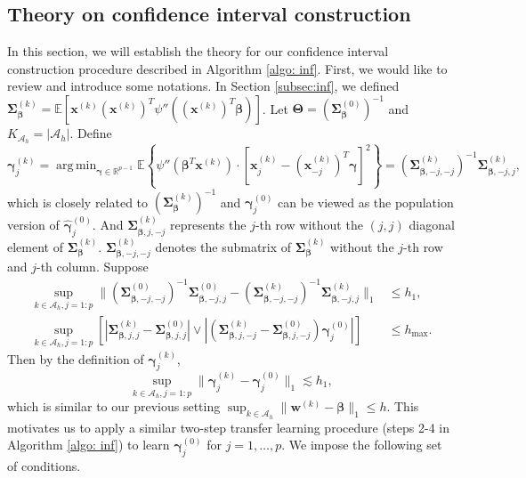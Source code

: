\documentclass[12pt]{article}
\DeclareMathOperator*{\argmin}{arg\,min}
\newcommand{\te}{\mathbb{E}}
\newcommand{\onenorm}[1]{\|#1\|_{1}}
\newcommand{\norm}[1]{|#1|}
\newcommand{\bbeta}{\bm{\beta}}
\newcommand{\bgamma}{\bm{\gamma}}
\newcommand{\bgammak}[1]{\bm{\gamma}^{(#1)}}
\newcommand{\hbgammak}[1]{\hat{\bm{\gamma}}^{(#1)}}
\newcommand{\bxk}[1]{\bm{x}^{(#1)}}
\newcommand{\bwk}[1]{\bm{w}^{(#1)}}
\newcommand{\mah}{\mathcal{A}_h}
\newcommand{\Kah}{K_{\mah}}
\newcommand{\<}{\langle}
\renewcommand{\>}{\rangle}
\newcommand{\bTheta}{\bm{\Theta}}
\newcommand{\bSigmak}[1]{\bm{\Sigma}^{(#1)}}
\begin{document}
\subsection{Theory on confidence interval construction}\label{subsec:inf theory}
In this section, we will establish the theory for our confidence interval construction procedure described in Algorithm \ref{algo: inf}. First, we would like to review and introduce some notations. In Section \ref{subsec:inf}, we defined $\bSigmak{k}_{\bbeta} = \te[\bxk{k}(\bxk{k})^T\psi''((\bxk{k})^T\bbeta)]$. Let $\bTheta = (\bSigmak{0}_{\bbeta})^{-1}$ and $\Kah  = \norm{\mah}$. Define
\begin{equation}
	\bgammak{k}_j = \argmin_{\bgamma \in \mathbb{R}^{p-1}} \te\left\{\psi''(\bbeta^T\bxk{k})\cdot [\bxk{k}_{j} - (\bxk{k}_{-j})^T\bgamma]^2 \right\} = (\bSigmak{k}_{\bbeta, -j, -j})^{-1}\bSigmak{k}_{\bbeta, -j, j},
\end{equation}
which is closely related to $(\bSigmak{k}_{\bbeta})^{-1}$ and $\bgammak{0}_j$ can be viewed as the population version of $\hbgammak{0}_j$. And $\bSigmak{k}_{\bbeta, j, -j}$ represents the $j$-th row without the $(j,j)$ diagonal element of $\bSigmak{k}_{\bbeta}$. $\bSigmak{k}_{\bbeta, -j, -j}$ denotes the submatrix of $\bSigmak{k}_{\bbeta}$ without the $j$-th row and $j$-th column.
Suppose 
\begin{align}
	\sup_{k \in \mah, j = 1:p}\onenorm{(\bSigmak{0}_{\bbeta, -j, -j})^{-1}\bSigmak{0}_{\bbeta, -j, j} - (\bSigmak{k}_{\bbeta, -j, -j})^{-1}\bSigmak{k}_{\bbeta, -j, j}} &\leq h_1, \\
	\sup_{k \in \mah, j = 1:p}\left[\norm{\bSigmak{k}_{\bbeta,j,j} - \bSigmak{0}_{\bbeta,j,j}}\vee \norm{(\bSigmak{k}_{\bbeta, j, -j} - \bSigmak{0}_{\bbeta, j, -j})\bgammak{0}_j}\right] &\leq h_{\max}.
\end{align}
Then by the definition of $\bgammak{k}_j$, 
\begin{equation}
	\sup_{k \in \mah, j = 1:p} \onenorm{\bgammak{k}_j-\bgammak{0}_j} \lesssim  h_1,
\end{equation}
which is similar to our previous setting $\sup_{k \in \mah}\onenorm{\bwk{k}-\bbeta} \leq h$. This motivates us to apply a similar two-step transfer learning procedure (steps 2-4 in Algorithm \ref{algo: inf}) to learn $\bgammak{0}_j$ for $j = 1, \ldots, p$. We impose the following set of conditions.
\end{document}
